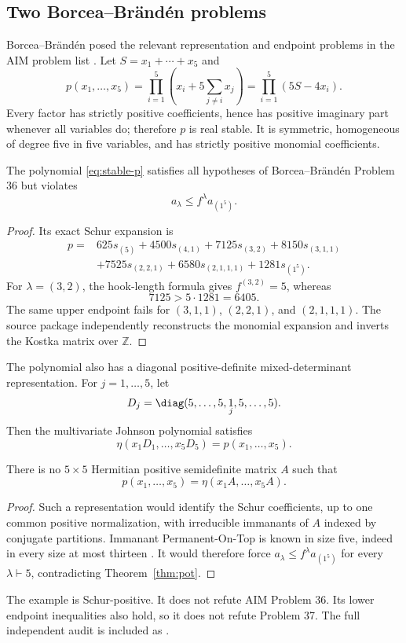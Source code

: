 \subsection{Two Borcea--Br\"and\'en problems}

Borcea--Br\"and\'en posed the relevant representation and endpoint problems in the AIM problem list \cite{AIMStableProblems}.  Let $S=x_1+\cdots+x_5$ and
\begin{equation}\label{eq:stable-p}
p(x_1,\ldots,x_5)=\prod_{i=1}^5\left(x_i+5\sum_{j\ne i}x_j\right)=\prod_{i=1}^5(5S-4x_i).
\end{equation}
Every factor has strictly positive coefficients, hence has positive imaginary part whenever all variables do; therefore $p$ is real stable.  It is symmetric, homogeneous of degree five in five variables, and has strictly positive monomial coefficients.

\begin{theorem}\label{thm:pot}
The polynomial \eqref{eq:stable-p} satisfies all hypotheses of Borcea--Br\"and\'en Problem 36 but violates
\[
a_\lambda\le f^\lambda a_{(1^5)}.
\]
\end{theorem}
\begin{proof}
Its exact Schur expansion is
\begin{align*}
p={}&625s_{(5)}+4500s_{(4,1)}+7125s_{(3,2)}+8150s_{(3,1,1)}\\
&+7525s_{(2,2,1)}+6580s_{(2,1,1,1)}+1281s_{(1^5)}.
\end{align*}
For $\lambda=(3,2)$, the hook-length formula gives $f^{(3,2)}=5$, whereas
\[
7125>5\cdot1281=6405.
\]
The same upper endpoint fails for $(3,1,1)$, $(2,2,1)$, and $(2,1,1,1)$.  The source package independently reconstructs the monomial expansion and inverts the Kostka matrix over $\mathbb Z$.
\end{proof}

The polynomial also has a diagonal positive-definite mixed-determinant representation.  For $j=1,\ldots,5$, let
\[
D_j=\diag(5,\ldots,5,\underset{j}{1},5,\ldots,5).
\]
Then the multivariate Johnson polynomial satisfies
\[
\eta(x_1D_1,\ldots,x_5D_5)=p(x_1,\ldots,x_5).
\]

\begin{theorem}\label{thm:common-A}
There is no $5\times5$ Hermitian positive semidefinite matrix $A$ such that
\[
p(x_1,\ldots,x_5)=\eta(x_1A,\ldots,x_5A).
\]
\end{theorem}
\begin{proof}
Such a representation would identify the Schur coefficients, up to one common positive normalization, with irreducible immanants of $A$ indexed by conjugate partitions.  Immanant Permanent-On-Top is known in size five, indeed in every size at most thirteen \cite{Wanless2022}.  It would therefore force
$a_\lambda\le f^\lambda a_{(1^5)}$ for every $\lambda\vdash5$, contradicting Theorem~\ref{thm:pot}.
\end{proof}

\begin{remark}[Scope]
The example is Schur-positive.  It does not refute AIM Problem 36.  Its lower endpoint inequalities also hold, so it does not refute Problem 37.  The full independent audit is included as .
\end{remark}
